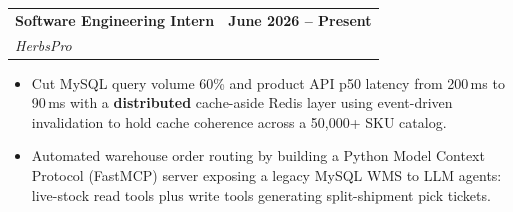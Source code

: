 \documentclass[letterpaper,10pt]{article}
\makeatletter
\newcommand{\resumeItem}[1]{
  \item\small{
    {#1 \vspace{-3pt}}
  }
}
\newcommand{\resumeSubheading}[4]{
  \vspace{-2pt}\item
    \begin{tabular*}{0.97\textwidth}[t]{l@{\extracolsep{\fill}}r}
      \textbf{#1} & \textbf{#2} \\   %
      \textit{\small#3} & \textit{\small #4} \\
    \end{tabular*}\vspace{-7pt}
}
\newcommand{\resumeItemListStart}{\begin{itemize}}
\newcommand{\resumeItemListEnd}{\end{itemize}\vspace{-7pt}}
\makeatother
\begin{document}
    \resumeSubheading
      {Software Engineering Intern}{June 2026 -- Present}
      {HerbsPro}{}
      \resumeItemListStart
        \resumeItem{Cut MySQL query volume 60\% and product API p50 latency from 200\,ms to 90\,ms with a \textbf{distributed} cache-aside Redis layer using event-driven invalidation to hold cache coherence across a 50,000+ SKU catalog.}
        \resumeItem{Automated warehouse order routing by building a Python Model Context Protocol (FastMCP) server exposing a legacy MySQL WMS to LLM agents: live-stock read tools plus write tools generating split-shipment pick tickets.}
      \resumeItemListEnd
\end{document}
